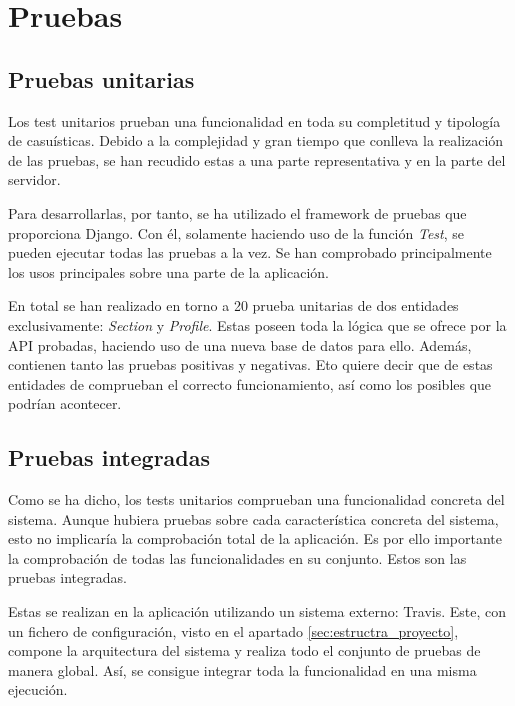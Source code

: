 
\chapter{Pruebas}\label{pruebas}
\section{Pruebas unitarias}\label{sec:pruebas_unitarias}

Los test unitarios prueban una funcionalidad en toda su completitud y tipología de casuísticas. Debido a la complejidad y gran tiempo que conlleva la realización de las pruebas, se han recudido estas a una parte representativa y en la parte del servidor.

Para desarrollarlas, por tanto, se ha utilizado el framework de pruebas que proporciona Django. Con él, solamente haciendo uso de la función \textit{Test}, se pueden ejecutar todas las pruebas a la vez. Se han comprobado principalmente los usos principales sobre una parte de la aplicación.

En total se han realizado en torno a 20 prueba unitarias de dos entidades exclusivamente: \textit{Section} y \textit{Profile}. Estas poseen toda la lógica que se ofrece por la API probadas, haciendo uso de una nueva base de datos para ello. Además, contienen tanto las pruebas positivas y negativas. Eto quiere decir que de estas entidades de comprueban el correcto funcionamiento, así como los posibles que podrían acontecer.

\section{Pruebas integradas}\label{sec:pruebas_integradas}

Como se ha dicho, los tests unitarios comprueban una funcionalidad concreta del sistema. Aunque hubiera pruebas sobre cada característica concreta del sistema, esto no implicaría la comprobación total de la aplicación. Es por ello importante la comprobación de todas las funcionalidades en su conjunto. Estos son las pruebas integradas.


Estas se realizan en la aplicación utilizando un sistema externo: Travis. Este, con un fichero de configuración, visto en el apartado \ref{sec:estructra_proyecto}, compone la arquitectura del sistema y realiza todo el conjunto de pruebas de manera global. Así, se consigue integrar toda la funcionalidad en una misma ejecución.


